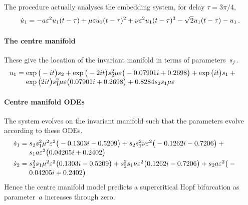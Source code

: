 The procedure actually analyses the embedding system, for
delay \(\tau=3\pi/4\),
\begin{equation*}
\dot u_{1}=-a \varepsilon^{2} u_1(t-\tau)
+\mu  \varepsilon  u_1(t-\tau)^{2}
+\nu  \varepsilon^{2} u_1(t-\tau)^{3}
-\sqrt {2} u_1(t-\tau)-u\sb1
\,.
\end{equation*}

\paragraph{The centre manifold} 
These give the location of the invariant manifold in terms
of parameters~\(s\sb j\).
\begin{align*}&
u_{1}=\ParMath{
\exp \big(-i t\big) s_{2}+\exp \big(-2 i t\big) s_{2}^{2} \mu  
\eps \big(-0.07901 i+0.2698\big)+\exp \big(i t\big) s_{1}+\exp \big(
2 i t\big) s_{1}^{2} \mu  \eps \big(0.07901 i+0.2698\big)+0.8284 s
_{2} s_{1} \mu  \eps
}
\end{align*}
 
\paragraph{Centre manifold ODEs} 
The system evolves on the invariant manifold such that the
parameters evolve according to these ODEs.
\begin{align*}&
\dot s_{1}=\ParMath{
s_{2} s_{1}^{2} \mu ^{2} \eps^{2} \big(-0.1303 i-0.5209
\big)+s_{2} s_{1}^{2} \nu  \eps^{2} \big(-0.1262 i-0.7206\big)+s_{1}
 a \eps^{2} \big(0.04205 i+0.2402\big)
}
 \\&
\dot s_{2}=\ParMath{
s_{2}^{2} s_{1} \mu ^{2} \eps^{2} \big(0.1303 i-0.5209
\big)+s_{2}^{2} s_{1} \nu  \eps^{2} \big(0.1262 i-0.7206\big)+s_{2} 
a \eps^{2} \big(-0.04205 i+0.2402\big)
}
\end{align*}
Hence the centre manifold model predicts a supercritical
Hopf bifurcation as parameter~\(a\) increases through zero.

